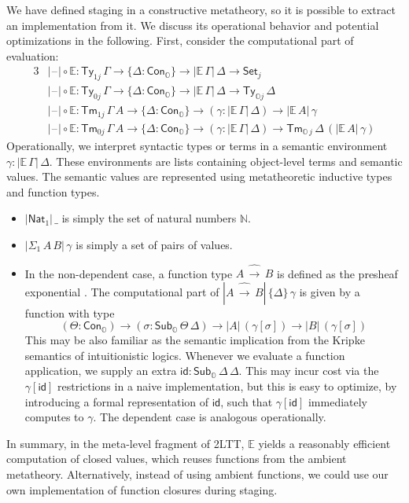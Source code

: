 \documentclass[acmsmall]{acmart}
\newcommand{\msf}[1]{\mathsf{#1}}
\newcommand{\mbb}[1]{\mathbb{#1}}
\newcommand{\wh}[1]{\widehat{#1}}
\newcommand{\mbbo}{\mbb{O}}
\newcommand{\Ty}{\msf{Ty}}
\newcommand{\Tm}{\msf{Tm}}
\newcommand{\Cono}{\msf{Con}_{\mbbo}}
\newcommand{\Subo}{\msf{Sub}_{\mbbo}}
\newcommand{\Nat}{\msf{Nat}}
\newcommand{\id}{\msf{id}}
\newcommand{\Set}{\mathsf{Set}}
\newcommand{\blank}{{\mathord{\hspace{1pt}\text{--}\hspace{1pt}}}}
\newcommand{\ev}{\mbb{E}}
\theoremstyle{remark}
\begin{document}
We have defined staging in a constructive metatheory, so it is possible to
extract an implementation from it. We discuss its operational behavior and
potential optimizations in the following. First, consider the computational
part of evaluation:
\begin{alignat*}{3}
  & |\blank| \circ \ev : \Ty_{1 j}\,\Gamma \to \{\Delta : \Cono\} \to |\ev\,\Gamma|\,\Delta \to \Set_j\\
  & |\blank| \circ \ev : \Ty_{0 j}\,\Gamma \to \{\Delta : \Cono\} \to |\ev\,\Gamma|\,\Delta \to \Ty_{\mbbo j}\,\Delta\\
  & |\blank| \circ \ev : \Tm_{1 j}\,\Gamma\,A \to \{\Delta : \Cono\} \to (\gamma : |\ev\,\Gamma|\,\Delta) \to
    |\ev\,A|\,\gamma \\
  & |\blank| \circ \ev : \Tm_{0 j}\,\Gamma\,A \to \{\Delta : \Cono\} \to (\gamma : |\ev\,\Gamma|\,\Delta) \to
    \Tm_{\mbbo\,j}\,\Delta\,(|\ev\,A|\,\gamma)
\end{alignat*}
Operationally, we interpret syntactic types or terms in a semantic environment
$\gamma : |\ev\,\Gamma|\,\Delta$. These environments are lists containing
object-level terms and semantic values. The semantic values are represented
using metatheoretic inductive types and function types.
\begin{itemize}
  \item $|\Nat_1|\,\_$ is simply the set of natural numbers $\mbb{N}$.
  \item $|\Sigma_1\,A\,B|\,\gamma$ is simply a set of pairs of values.
  \item In the non-dependent case, a function type $A\,\wh{\to}\,B$ is defined as the presheaf
        exponential \cite{TODO}. The computational part of $|A\,\wh{\to}\,B|\,\{\Delta\}\,\gamma$
        is given by a function with type
        \[ (\Theta : \Cono) \to (\sigma : \Subo\,\Theta\,\Delta) \to |A|\,(\gamma[\sigma]) \to |B|\,(\gamma[\sigma])        \]
        This may be also familiar as the semantic implication from the Kripke
        semantics of intuitionistic logics. Whenever we evaluate a function
        application, we supply an extra $\id : \Subo\,\Delta\,\Delta$. This may
        incur cost via the $\gamma[\id]$ restrictions in a naive
        implementation, but this is easy to optimize, by introducing a formal
        representation of $\id$, such that $\gamma[\id]$ immediately computes to
        $\gamma$. The dependent case is analogous operationally.
\end{itemize}
In summary, in the meta-level fragment of 2LTT, $\ev$ yields a reasonably efficient
computation of closed values, which reuses functions from the ambient
metatheory. Alternatively, instead of using ambient functions, we could use our
own implementation of function closures during staging.
\end{document}
